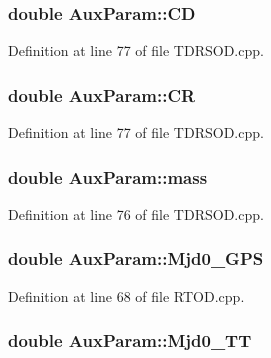 \hypertarget{structAuxParam_af83c855c2c9a458df9fb34c0aa20c1fc}{
\subsubsection[{C\-D}]{\setlength{\rightskip}{0pt plus 5cm}double Aux\-Param\-::\-C\-D}}\label{structAuxParam_af83c855c2c9a458df9fb34c0aa20c1fc}


Definition at line 77 of file T\-D\-R\-S\-O\-D.\-cpp.

\hypertarget{structAuxParam_ab3aad49adad1f5abe376ef54d87a5564}{
\subsubsection[{C\-R}]{\setlength{\rightskip}{0pt plus 5cm}double Aux\-Param\-::\-C\-R}}\label{structAuxParam_ab3aad49adad1f5abe376ef54d87a5564}


Definition at line 77 of file T\-D\-R\-S\-O\-D.\-cpp.

\hypertarget{structAuxParam_afb25e5df632f3a7ba7b18755dcad08ad}{
\subsubsection[{mass}]{\setlength{\rightskip}{0pt plus 5cm}double Aux\-Param\-::mass}}\label{structAuxParam_afb25e5df632f3a7ba7b18755dcad08ad}


Definition at line 76 of file T\-D\-R\-S\-O\-D.\-cpp.

\hypertarget{structAuxParam_ac11f26de5fc55f2ae6fa20349290be18}{
\subsubsection[{Mjd0\-\_\-\-G\-P\-S}]{\setlength{\rightskip}{0pt plus 5cm}double Aux\-Param\-::\-Mjd0\-\_\-\-G\-P\-S}}\label{structAuxParam_ac11f26de5fc55f2ae6fa20349290be18}


Definition at line 68 of file R\-T\-O\-D.\-cpp.

\hypertarget{structAuxParam_a57f18ab074819216ae0dcc8d4966e636}{
\subsubsection[{Mjd0\-\_\-\-T\-T}]{\setlength{\rightskip}{0pt plus 5cm}double Aux\-Param\-::\-Mjd0\-\_\-\-T\-T}}\label{structAuxParam_a57f18ab074819216ae0dcc8d4966e636}


